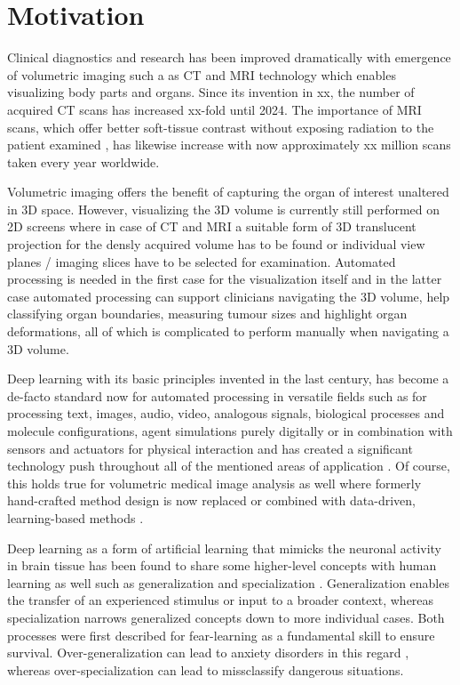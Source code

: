 \section{Motivation} %
    Clinical diagnostics and research has been improved dramatically with emergence of volumetric imaging such a as \ac{CT} and \ac{MRI} technology which enables visualizing body parts and organs.
    Since its invention in xx, the number of acquired \ac{CT} scans has increased xx-fold until 2024. The importance of \ac{MRI} scans, which offer better soft-tissue contrast without exposing radiation to the patient examined \citep{xx}, has likewise increase with now approximately xx million scans taken every year worldwide.

    Volumetric imaging offers the benefit of capturing the organ of interest unaltered in \ac{3D} space. However, visualizing the \ac{3D} volume is currently still performed on \ac{2D} screens where in case of \ac{CT} and \ac{MRI} a suitable form of \ac{3D} translucent projection for the densly acquired volume has to be found or individual view planes / imaging slices have to be selected for examination. Automated processing is needed in the first case for the visualization itself and in the latter case automated processing can support clinicians navigating the \ac{3D} volume, help classifying organ boundaries, measuring tumour sizes and highlight organ deformations, all of which is complicated to perform manually when navigating a \ac{3D} volume.

    Deep learning with its basic principles invented in the last century, has become a de-facto standard now for automated processing in versatile fields such as for processing text, images, audio, video, analogous signals, biological processes and molecule configurations, agent simulations purely digitally or in combination with sensors and actuators for physical interaction \citep{xx} and has created a significant technology push throughout all of the mentioned areas of application \citep{xx}.
    Of course, this holds true for volumetric medical image analysis as well where formerly hand-crafted method design is now replaced or combined with data-driven, learning-based methods \citep{xx}.

    Deep learning as a form of artificial learning that mimicks the neuronal activity in brain tissue has been found to share some higher-level concepts with human learning as well such as generalization and specialization \citep{xx}.
    Generalization enables the transfer of an experienced stimulus or input to a broader context, whereas specialization narrows generalized concepts down to more individual cases.
    Both processes were first described for fear-learning as a fundamental skill to ensure survival. Over-generalization can lead to anxiety disorders in this regard \citep{xx}, whereas over-specialization can lead to missclassify dangerous situations.

